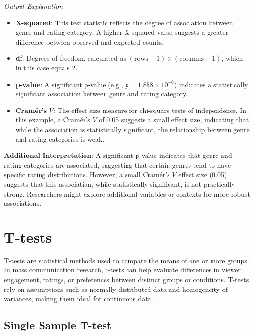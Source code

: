 \documentclass[
]{book}
\providecommand{\tightlist}{%
  \setlength{\itemsep}{0pt}\setlength{\parskip}{0pt}}
\begin{document}
\emph{Output Explanation}

\begin{itemize}
\tightlist
\item
  \textbf{X-squared}: This test statistic reflects the degree of association between genre and rating category. A higher X-squared value suggests a greater difference between observed and expected counts.
\item
  \textbf{df}: Degrees of freedom, calculated as \((\text{rows} - 1) \times (\text{columns} - 1)\), which in this case equals 2.
\item
  \textbf{p-value}: A significant p-value (e.g., \(p = 1.858 \times 10^{-6}\)) indicates a statistically significant association between genre and rating category.
\item
  \textbf{Cramér's} \(V\): The effect size measure for chi-square tests of independence. In this example, a Cramér's \(V\) of 0.05 suggests a small effect size, indicating that while the association is statistically significant, the relationship between genre and rating categories is weak.
\end{itemize}

\textbf{Additional Interpretation}: A significant p-value indicates that genre and rating categories are associated, suggesting that certain genres tend to have specific rating distributions. However, a small Cramér's \(V\) effect size (0.05) suggests that this association, while statistically significant, is not practically strong. Researchers might explore additional variables or contexts for more robust associations.

\section{T-tests}\label{t-tests}

T-tests are statistical methods used to compare the means of one or more groups. In mass communication research, t-tests can help evaluate differences in viewer engagement, ratings, or preferences between distinct groups or conditions. T-tests rely on assumptions such as normally distributed data and homogeneity of variances, making them ideal for continuous data.

\subsection*{Single Sample T-test}\label{single-sample-t-test}
\end{document}
